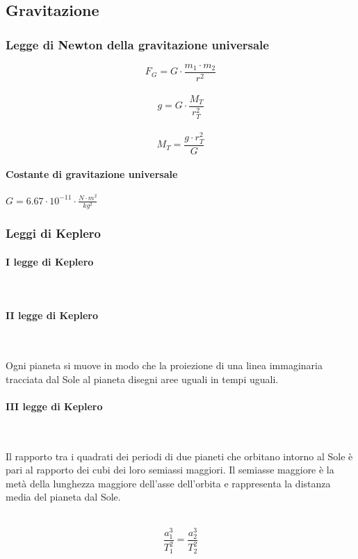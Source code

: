 \documentclass[a4paper,12pt]{article}
\theoremstyle{mystyle}
\begin{document}
\newpage


\subsection{Gravitazione}
\subsubsection{Legge di Newton della gravitazione universale}
\[F_G = G \cdot \frac{m_1\cdot m_2}{r^2}\]\\
\[g= G \cdot\frac{M_T}{r_T^2}\]\\
\[M_T=\frac{g \cdot r_T^2}{G}\]
\paragraph{Costante di gravitazione universale}
\(G= 6.67 \cdot 10^{-11} \cdot \frac{N \cdot m^2}{kg^2}\)
\subsubsection{Leggi di Keplero}
\paragraph{I legge di Keplero}\mbox{}\\
\parbox{0.8\textwidth}{
}

\paragraph{II legge di Keplero}\mbox{}\\
\parbox{0.8\textwidth}{
Ogni pianeta si muove in modo che la proiezione di una linea immaginaria tracciata dal Sole al pianeta disegni aree uguali in tempi uguali.
}

\paragraph{III legge di Keplero}\mbox{}\\
\parbox{0.8\textwidth}{
Il rapporto tra i quadrati dei periodi di due pianeti che orbitano intorno al Sole è pari al rapporto dei cubi dei loro semiassi maggiori. 
Il semiasse maggiore è la metà della lunghezza maggiore dell'asse dell'orbita e rappresenta la distanza media del pianeta dal Sole.
} \\
\[\frac{a_1^3}{T_1^2} = \frac{a_2^3}{T_2^2}\]
\end{document}
